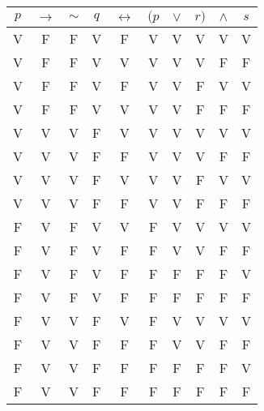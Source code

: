 \documentclass[12pt,a4paper,oneside]{article}
\begin{document}
\begin{enumerate}
	\begin{tabular}{|c|c|c|c|c|c|c|c|c|c|}
		\hline
		$p$ & $\rightarrow$ & $\sim$ & $q$ & $\leftrightarrow$ & $(p$ & $\vee$ & $r)$ & $\wedge$ & $s$  \\
		\hline
		V & F & F & V & F & V & V & V & V & V \\
		V & F & { \color{blue} F} & { \color{blue} V} & { \color{blue} V} & V & V & V & F & F \\
		V & F & { \color{blue} F} & { \color{blue} V} & { \color{blue} F} & V & V & F & V & V \\
		V & F & { \color{blue} F} & { \color{blue} V} & { \color{blue} V} & V & V & F & F & F \\
		V & V & V & F & V & V & V & V & V & V \\
		V & V & V & F & F & V & V & V & F & F \\
		V & V & V & F & V & V & V & F & V & V \\
		V & V & V & F & F & V & V & F & F & F \\
		F & V & F & V & V & F & V & V & V & V \\
		F & V & F & V & F & F & { \color{blue} V} & { \color{blue} V} & { \color{blue} F} & F \\
		F & V & F & V & F & F & { \color{blue} F} & { \color{blue} F} & { \color{blue} F} & V \\
		F & V & F & V & F & F & { \color{blue} F} & { \color{blue} F} & { \color{blue} F} & F \\
		F & V & V & F & V & F & V & V & V & V \\
		F & V & V & F & F & F & V & V & F & F \\
		F & V & V & F & F & F & F & F & F & V \\
		F & V & V & F & F & F & F & F & F & F \\
		\hline
	\end{tabular}

\end{enumerate}
\end{document}
